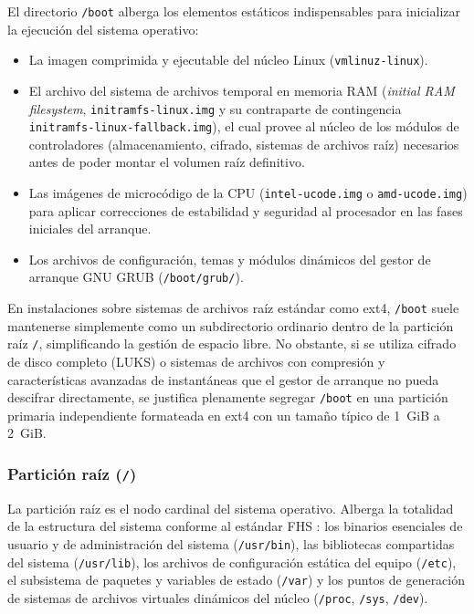 \documentclass[12pt]{article}
\begin{document}
El directorio \texttt{/boot} alberga los elementos estáticos indispensables para inicializar la ejecución del sistema operativo:
\begin{itemize}[noitemsep, topsep=2pt]
    \item La imagen comprimida y ejecutable del núcleo Linux (\texttt{vmlinuz-linux}).
    \item El archivo del sistema de archivos temporal en memoria RAM (\textit{initial RAM filesystem}, \texttt{initramfs-linux.img} y su contraparte de contingencia \texttt{initramfs-linux-fallback.img}), el cual provee al núcleo de los módulos de controladores (almacenamiento, cifrado, sistemas de archivos raíz) necesarios antes de poder montar el volumen raíz definitivo.
    \item Las imágenes de microcódigo de la CPU (\texttt{intel-ucode.img} o \texttt{amd-ucode.img}) para aplicar correcciones de estabilidad y seguridad al procesador en las fases iniciales del arranque.
    \item Los archivos de configuración, temas y módulos dinámicos del gestor de arranque GNU GRUB (\texttt{/boot/grub/}).
\end{itemize}
En instalaciones sobre sistemas de archivos raíz estándar como ext4, \texttt{/boot} suele mantenerse simplemente como un subdirectorio ordinario dentro de la partición raíz \texttt{/}, simplificando la gestión de espacio libre. No obstante, si se utiliza cifrado de disco completo (LUKS) o sistemas de archivos con compresión y características avanzadas de instantáneas que el gestor de arranque no pueda descifrar directamente, se justifica plenamente segregar \texttt{/boot} en una partición primaria independiente formateada en ext4 con un tamaño típico de 1~GiB a 2~GiB.

\subsubsection{Partición raíz (\texttt{/})}

La partición raíz es el nodo cardinal del sistema operativo. Alberga la totalidad de la estructura del sistema conforme al estándar FHS \parencite{fhs2015specification}: los binarios esenciales de usuario y de administración del sistema (\texttt{/usr/bin}), las bibliotecas compartidas del sistema (\texttt{/usr/lib}), los archivos de configuración estática del equipo (\texttt{/etc}), el subsistema de paquetes y variables de estado (\texttt{/var}) y los puntos de generación de sistemas de archivos virtuales dinámicos del núcleo (\texttt{/proc}, \texttt{/sys}, \texttt{/dev}).
\end{document}
